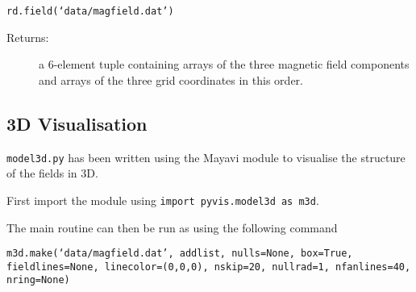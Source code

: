 \documentclass[12pt]{article}
\begin{document}
      \texttt{rd.field(`data/magfield.dat')}

      \begin{description}
        \item [Returns:] a 6-element tuple containing arrays of the three magnetic field components and arrays of the three grid coordinates in this order.
      \end{description}

    \subsection{3D Visualisation}

      \texttt{model3d.py} has been written using the Mayavi module to visualise the structure of the fields in 3D.

      First import the module using \texttt{import pyvis.model3d as m3d}.

      The main routine can then be run as using the following command

      \texttt{m3d.make(`data/magfield.dat', addlist, nulls=None, box=True, fieldlines=None, linecolor=(0,0,0), nskip=20, nullrad=1, nfanlines=40, nring=None)}
\end{document}
